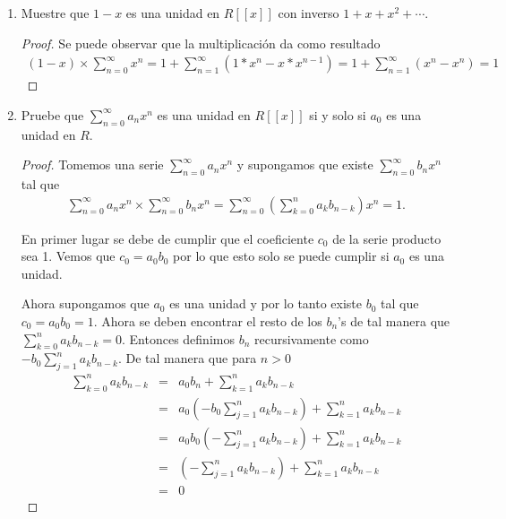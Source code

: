 \documentclass[letter,twoside,12pt]{article}
\begin{document}
\begin{enumerate}[label=\textbf{(\alph*)}]
\begin{proof}
Por otra parte $\sum_{n=0}^{\infty}a_nx^n \times \sum_{n=0}^{\infty}e_nx^n= \sum_{n=0}^{\infty}a_nx^n$ por la conmutatividad de la multiplicaci\'on demostrada anteriormente.
\end{proof}
\item Muestre que $1-x$ es una unidad en $R[[x]]$ con inverso $1+x+x^2+ \cdots$.
\begin{proof}
Se puede observar que la multiplicaci\'on da como resultado
\begin{eqnarray}
(1-x)\times \sum_{n=0}^{\infty} x^n=1+\sum_{n=1}^{\infty}(1*x^{n}-x*x^{n-1})=1+\sum_{n=1}^{\infty}(x^{n}-x^n)= 1\nonumber
\end{eqnarray}
\end{proof}
\item Pruebe que $\sum_{n=0}^{\infty} a_nx^n$ es una unidad en $R[[x]]$ si y solo si $a_0$ es una unidad en $R$.
\begin{proof}
Tomemos una serie $\sum_{n=0}^{\infty} a_nx^n$ y supongamos que existe $\sum_{n=0}^{\infty} b_nx^n$ tal que
\begin{eqnarray}
\sum_{n=0}^{\infty} a_nx^n \times \sum_{n=0}^{\infty}b_nx^n=\sum_{n=0}^{\infty}(\sum_{k=0}^{n}a_kb_{n-k})x^n = 1\nonumber. 
\end{eqnarray}

En primer lugar se debe de cumplir que el coeficiente $c_0$ de la serie producto sea 1. Vemos que $c_0=a_0b_0$ por lo que esto solo se puede cumplir si $a_0$ es una unidad.

Ahora supongamos que $a_0$ es una unidad y por lo tanto existe $b_0$ tal que $c_0=a_0b_0=1$.  Ahora se deben encontrar el resto de los $b_n$'s de tal manera que $\sum_{k=0}^{n} a_kb_{n-k}=0$. Entonces definimos $b_n$ recursivamente como $-b_0\sum_{j=1}^{n} a_kb_{n-k}$. De tal manera que para $n>0$
\begin{eqnarray}
\sum_{k=0}^{n}a_kb_{n-k}&=&a_0b_n+\sum_{k=1}^{n}a_kb_{n-k} \nonumber
\\ &=& a_0(-b_0\sum_{j=1}^{n} a_kb_{n-k})+\sum_{k=1}^{n}a_kb_{n-k} \nonumber
\\&=& a_0b_0(-\sum_{j=1}^{n} a_kb_{n-k})+\sum_{k=1}^{n}a_kb_{n-k} \nonumber
\\&=& (-\sum_{j=1}^{n} a_kb_{n-k})+\sum_{k=1}^{n}a_kb_{n-k} \nonumber
\\&=&0 \nonumber
\end{eqnarray}

\end{proof}
\end{enumerate}
\newpage
\end{document}
